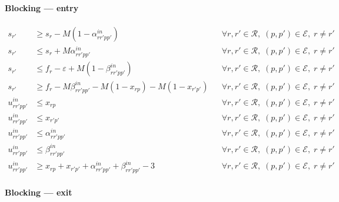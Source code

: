 \paragraph{Blocking — entry}

\begin{align}
s_{r'} &\ge s_r - M \left( 1 - \alpha^{in}_{rr'pp'} \right)
&& \forall r,r' \in \mathcal{R},\; (p,p') \in \mathcal{E},\; r \neq r' \\
s_{r'} &\le s_r + M \alpha^{in}_{rr'pp'}
&& \forall r,r' \in \mathcal{R},\; (p,p') \in \mathcal{E},\; r \neq r' \\
s_{r'} &\le f_r - \varepsilon + M \left( 1 - \beta^{in}_{rr'pp'} \right)
&& \forall r,r' \in \mathcal{R},\; (p,p') \in \mathcal{E},\; r \neq r' \\
s_{r'} &\ge f_r - M \beta^{in}_{rr'pp'} - M(1-x_{rp}) - M(1-x_{r'p'})
&& \forall r,r' \in \mathcal{R},\; (p,p') \in \mathcal{E},\; r \neq r' \\
u^{in}_{rr'pp'} &\le x_{rp}
&& \forall r,r' \in \mathcal{R},\; (p,p') \in \mathcal{E},\; r \neq r' \\
u^{in}_{rr'pp'} &\le x_{r'p'}
&& \forall r,r' \in \mathcal{R},\; (p,p') \in \mathcal{E},\; r \neq r' \\
u^{in}_{rr'pp'} &\le \alpha^{in}_{rr'pp'}
&& \forall r,r' \in \mathcal{R},\; (p,p') \in \mathcal{E},\; r \neq r' \\
u^{in}_{rr'pp'} &\le \beta^{in}_{rr'pp'}
&& \forall r,r' \in \mathcal{R},\; (p,p') \in \mathcal{E},\; r \neq r' \\
u^{in}_{rr'pp'} &\ge x_{rp} + x_{r'p'} + \alpha^{in}_{rr'pp'} + \beta^{in}_{rr'pp'} - 3
&& \forall r,r' \in \mathcal{R},\; (p,p') \in \mathcal{E},\; r \neq r'
\end{align}

\paragraph{Blocking — exit}

